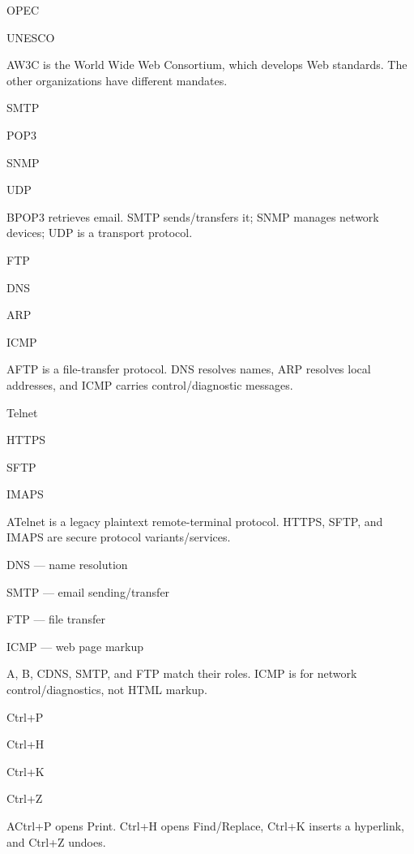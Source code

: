 \begin{enumerate}[label=\textbf{Q\arabic*.}, leftmargin=*]
{   \item OPEC
   \item UNESCO}
  {A}{W3C is the World Wide Web Consortium, which develops Web standards. The other organizations have different mandates.}
  {\item SMTP
   \item POP3
   \item SNMP
   \item UDP}
  {B}{POP3 retrieves email. SMTP sends/transfers it; SNMP manages network devices; UDP is a transport protocol.}
  {\item FTP
   \item DNS
   \item ARP
   \item ICMP}
  {A}{FTP is a file-transfer protocol. DNS resolves names, ARP resolves local addresses, and ICMP carries control/diagnostic messages.}
  {\item Telnet
   \item HTTPS
   \item SFTP
   \item IMAPS}
  {A}{Telnet is a legacy plaintext remote-terminal protocol. HTTPS, SFTP, and IMAPS are secure protocol variants/services.}
  {\item DNS --- name resolution
   \item SMTP --- email sending/transfer
   \item FTP --- file transfer
   \item ICMP --- web page markup}
  {A, B, C}{DNS, SMTP, and FTP match their roles. ICMP is for network control/diagnostics, not HTML markup.}
\fi
\ifnum{}
  {\item Ctrl+P
   \item Ctrl+H
   \item Ctrl+K
   \item Ctrl+Z}
  {A}{Ctrl+P opens Print. Ctrl+H opens Find/Replace, Ctrl+K inserts a hyperlink, and Ctrl+Z undoes.}

\end{enumerate}
